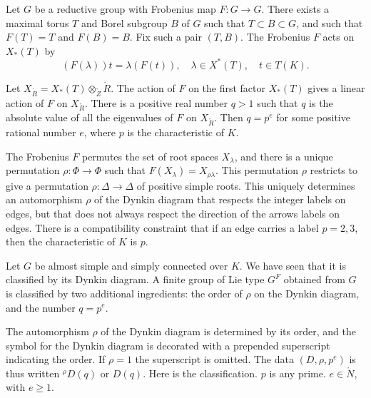 Let $G$ be a reductive group with Frobenius map $F:G\to G$.  There
exists a maximal torus $T$ and Borel subgroup $B$ of $G$ such that
$T\subset B\subset G$, and such that $F(T)=T$ and $F(B)=B$.  Fix such
a pair $(T,B)$.  The Frobenius $F$ acts on $X_*(T)$ by
\[
(F(\lambda)) t = \lambda(F(t)),\quad \lambda\in X^*(T),\quad t\in T(K).
\]

Let $X_{\ring{R}} = X_*(T)\otimes_\ring{Z} \ring{R}$.  The action of
$F$ on the first factor $X_*(T)$ gives a linear action of $F$ on
$X_{\ring{R}}$.  There is a positive real number $q > 1$ such that $q$
is the absolute value of all the eigenvalues of $F$ on $X_{\ring{R}}$.
Then $q = p^e$ for some positive rational number $e$, where $p$ is the
characteristic of $K$.


The Frobenius $F$ permutes the set of root spaces $X_\lambda$, and
there is a unique permutation $\rho:\Phi\to\Phi$ such that
$F(X_\lambda) = X_{\rho\lambda}$.  This permutation $\rho$ restricts
to give a permutation $\rho:\Delta\to\Delta$ of positive simple roots.
This uniquely determines an automorphism $\rho$ of the Dynkin diagram
that respects the integer labels on edges, but that does not always
respect the direction of the arrows labels on edges.  There is a
compatibility constraint that if an edge carries a label $p =2,3$,
then the characteristic of $K$ is $p$.


Let $G$ be almost simple and simply connected over $K$.  We have seen
that it is classified by its Dynkin diagram.  A finite group of Lie
type $G^F$ obtained from $G$ is classified by two additional
ingredients: the order of $\rho$ on the Dynkin diagram, and the number
$q = p^e$.

The automorphism $\rho$ of the Dynkin diagram is determined by its
order, and the symbol for the Dynkin diagram is decorated with a
prepended superscript indicating the order.  If $\rho=1$ the
superscript is omitted.  The data $(D,\rho,p^e)$ is thus written
${}^\rho D(q)$ or $D(q)$.  Here is the classification.  $p$ is any
prime. $e\in\ring{N}$, with $e\ge 1$.

